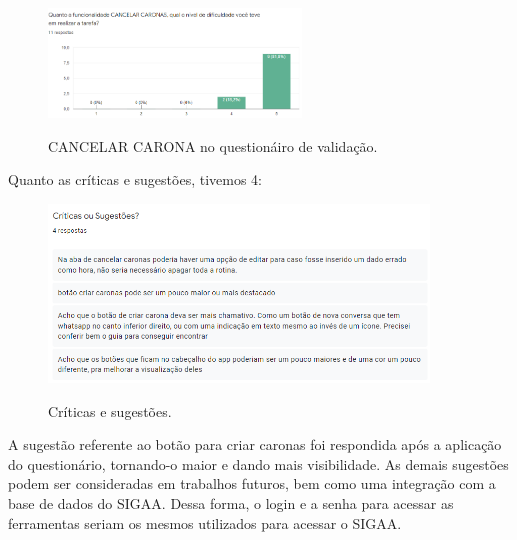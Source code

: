 \begin{figure}[H]
	\centering
	\caption{CANCELAR CARONA no questionáiro de validação.}
	\includegraphics[width=0.6\textwidth]{./04-figuras/validacao/cancelar_carona.png}
	\label{fig:cancela_carona}
\end{figure}

Quanto as críticas e sugestões, tivemos 4:

\begin{figure}[H]
	\centering
	\caption{Críticas e sugestões.}
	\includegraphics[width=0.9\textwidth]{./04-figuras/validacao/criticas_e_sugestoes.png}
	\label{fig:cancela_carona}
\end{figure}

A sugestão referente ao botão para criar caronas foi respondida após a aplicação do questionário, tornando-o maior e dando mais visibilidade. As demais sugestões podem ser consideradas em trabalhos futuros, bem como uma integração com a base de dados do SIGAA. Dessa forma, o login e a senha para acessar as ferramentas seriam os mesmos utilizados para acessar o SIGAA.


